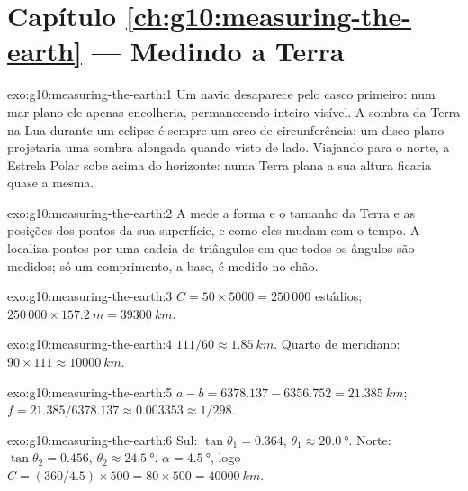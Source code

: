 \section*{Capítulo \ref{ch:g10:measuring-the-earth} --- Medindo a Terra}

\begin{solution}{exo:g10:measuring-the-earth:1}
Um navio desaparece pelo casco primeiro: num mar plano ele apenas
encolheria, permanecendo inteiro visível. A sombra da Terra na Lua durante
um eclipse é sempre um arco de circunferência: um disco plano projetaria uma
sombra alongada quando visto de lado. Viajando para o norte, a Estrela
Polar sobe acima do horizonte: numa Terra plana a sua altura ficaria quase
a mesma.
\end{solution}

\begin{solution}{exo:g10:measuring-the-earth:2}
A  mede a forma e o tamanho da Terra e as posições dos pontos da
sua superfície, e como eles mudam com o tempo. A  localiza
pontos por uma cadeia de triângulos em que todos os ângulos são medidos;
só um comprimento, a base, é medido no chão.
\end{solution}

\begin{solution}{exo:g10:measuring-the-earth:3}
$C = 50 \times 5000 = 250\,000$ estádios; $250\,000 \times \qty{157.2}{m} =
\qty{39300}{km}$.
\end{solution}

\begin{solution}{exo:g10:measuring-the-earth:4}
$111/60 \approx \qty{1.85}{km}$. Quarto de meridiano: $90 \times 111 \approx
\qty{10000}{km}$.
\end{solution}

\begin{solution}{exo:g10:measuring-the-earth:5}
$a - b = 6378.137 - 6356.752 = \qty{21.385}{km}$;
$f = 21.385/6378.137 \approx 0.003353 \approx 1/298$.
\end{solution}

\begin{solution}{exo:g10:measuring-the-earth:6}
Sul: $\tan\theta_1 = 0.364$, $\theta_1 \approx \qty{20.0}{\degree}$. Norte:
$\tan\theta_2 = 0.456$, $\theta_2 \approx \qty{24.5}{\degree}$.
$\alpha = \qty{4.5}{\degree}$, logo $C = (360/4.5) \times 500 = 80 \times 500 =
\qty{40000}{km}$.
\end{solution}

